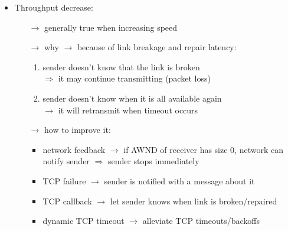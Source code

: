 \begin{itemize}
    \item Throughput decrease:
    \begin{itemize}
        \item[$\rightarrow$] generally true when increasing speed
        \item[$\rightarrow$] why $\rightarrow$ because of link breakage and repair latency:
        \begin{enumerate}
            \item sender doesn't know that the link is broken\\
            $\Rightarrow$ it may continue transmitting (packet loss)
            \item sender doesn't know when it is all available again\\
            $\rightarrow$ it will retransmit when timeout occurs
        \end{enumerate}
        \item[$\rightarrow$] how to improve it:
        \begin{itemize}
            \item network feedback $\rightarrow$ if AWND of receiver has size 0,
            network can notify sender $\Rightarrow$ sender stops immediately
            \item TCP failure $\rightarrow$ sender is notified with a message about it
            \item TCP callback $\rightarrow$ let sender knows when link is broken/repaired
            \item dynamic TCP timeout $\rightarrow$ alleviate TCP timeouts/backoffs
        \end{itemize}
    \end{itemize}
\end{itemize}
\newpage
